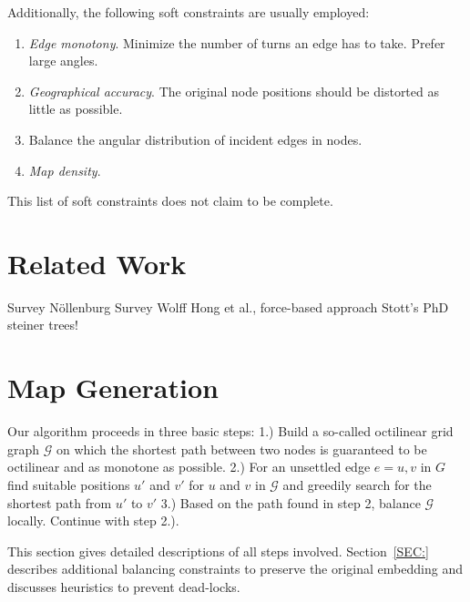 \documentclass{sig-alternate-sigmod09}
\begin{document}
Additionally, the following soft constraints are usually employed:

\begin{enumerate}
\setlength\itemsep{.1em}
\item \emph{Edge monotony}. Minimize the number of turns an edge has to take. Prefer large angles.
\item \emph{Geographical accuracy}. The original node positions should be distorted as little as possible.
\item \emph{} Balance the angular distribution of incident edges in nodes.
\item \emph{Map density}.
\end{enumerate}

This list of soft constraints does not claim to be complete. %

\section{Related Work}

Survey Nöllenburg %
Survey Wolff %
Hong et al., force-based approach
Stott's PhD
steiner trees! %

\section{Map Generation}

Our algorithm proceeds in three basic steps: 1.) Build a so-called octilinear grid graph $\mathcal{G}$ on which the shortest path between two nodes is guaranteed to be octilinear and as monotone as possible. 2.) For an unsettled edge $e = {u, v}$ in $G$ find suitable positions $u'$ and $v'$ for $u$ and $v$ in $\mathcal{G}$ and greedily search for the shortest path from $u'$ to $v'$ 3.) Based on the path found in step 2, balance $\mathcal{G}$ locally. Continue with step 2.).

This section gives detailed descriptions of all steps involved. Section~\ref{SEC:} describes additional balancing constraints to preserve the original embedding and discusses heuristics to prevent dead-locks.
\end{document}
